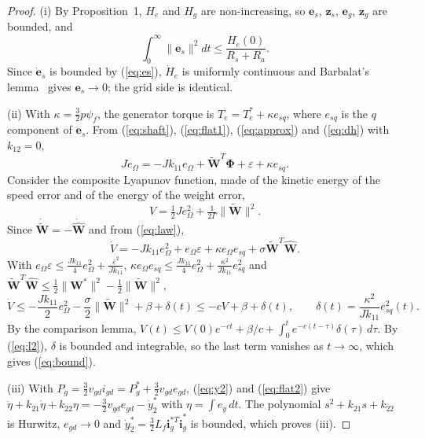 \documentclass[11pt,a4paper]{article}
\newcommand{\bv}[1]{\mathbf{#1}}
\begin{document}
\begin{proof}
(i) By Proposition~1, $H_e$ and $H_g$ are non-increasing, so $\bv{e}_s$, $\bv{z}_s$, $\bv{e}_g$, $\bv{z}_g$
are bounded, and
\begin{equation}
\int_0^\infty\|\bv{e}_s\|^2dt\le\frac{H_e(0)}{R_s+R_a} .
\label{eq:l2}
\end{equation}
Since $\dot{\bv{e}}_s$ is bounded by (\ref{eq:es}), $\dot H_e$ is uniformly continuous and Barbalat's
lemma~\cite{khalil2002} gives $\bv{e}_s\to0$; the grid side is identical.

(ii) With $\kappa=\frac32p\psi_f$, the generator torque is $T_e=T_e^*+\kappa e_{sq}$, where $e_{sq}$ is
the $q$ component of $\bv{e}_s$. From (\ref{eq:shaft}), (\ref{eq:flat1}), (\ref{eq:approx}) and
(\ref{eq:dh}) with $k_{12}=0$,
\begin{equation}
J\dot e_\Omega=-Jk_{11}e_\Omega+\tilde{\bv{W}}^T\boldsymbol\Phi+\varepsilon+\kappa e_{sq} .
\end{equation}
Consider the composite Lyapunov function, made of the kinetic energy of the speed error and of the
energy of the weight error,
\begin{equation}
V=\tfrac12Je_\Omega^2+\tfrac{1}{2\Gamma}\|\tilde{\bv{W}}\|^2 .
\end{equation}
Since $\dot{\tilde{\bv{W}}}=-\dot{\hat{\bv{W}}}$ and from (\ref{eq:law}),
\begin{equation}
\dot V=-Jk_{11}e_\Omega^2+e_\Omega\varepsilon+\kappa e_\Omega e_{sq}+\sigma\tilde{\bv{W}}^T\hat{\bv{W}} .
\end{equation}
With $e_\Omega\varepsilon\le\frac{Jk_{11}}{4}e_\Omega^2+\frac{\bar\varepsilon^2}{Jk_{11}}$,
$\kappa e_\Omega e_{sq}\le\frac{Jk_{11}}{4}e_\Omega^2+\frac{\kappa^2}{Jk_{11}}e_{sq}^2$ and
$\tilde{\bv{W}}^T\hat{\bv{W}}\le\frac12\|\bv{W}^*\|^2-\frac12\|\tilde{\bv{W}}\|^2$,
\begin{equation}
\dot V\le-\frac{Jk_{11}}{2}e_\Omega^2-\frac\sigma2\|\tilde{\bv{W}}\|^2+\beta+\delta(t)
\le-cV+\beta+\delta(t),\qquad \delta(t)=\frac{\kappa^2}{Jk_{11}}e_{sq}^2(t) .
\end{equation}
By the comparison lemma,
$V(t)\le V(0)e^{-ct}+\beta/c+\int_0^te^{-c(t-\tau)}\delta(\tau)\,d\tau$. By (\ref{eq:l2}), $\delta$ is
bounded and integrable, so the last term vanishes as $t\to\infty$, which gives (\ref{eq:bound}).

(iii) With $P_g=\frac32v_{gd}i_{gd}=P_g^*+\frac32v_{gd}e_{gd}$, (\ref{eq:y2}) and (\ref{eq:flat2}) give
$\ddot\eta+k_{21}\dot\eta+k_{22}\eta=-\frac32v_{gd}e_{gd}-\dot y_2^*$ with $\eta=\int e_y\,dt$. The
polynomial $s^2+k_{21}s+k_{22}$ is Hurwitz, $e_{gd}\to0$ and $\dot y_2^*=\frac32L_f\bv{i}_g^{*T}\dot{\bv{i}}_g^*$
is bounded, which proves (iii).
\end{proof}
\end{document}
